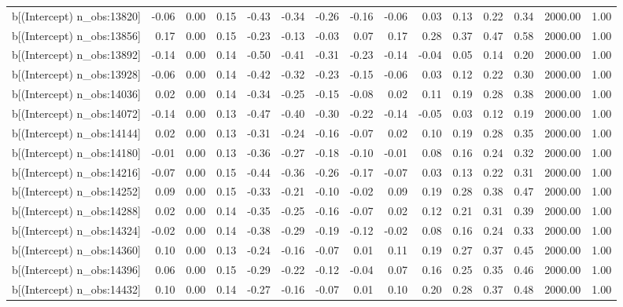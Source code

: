 \begin{table}[ht]
\begin{tabular}{rrrrrrrrrrrrrrr}
  b[(Intercept) n\_obs:13820] & -0.06 & 0.00 & 0.15 & -0.43 & -0.34 & -0.26 & -0.16 & -0.06 & 0.03 & 0.13 & 0.22 & 0.34 & 2000.00 & 1.00 \\ 
  b[(Intercept) n\_obs:13856] & 0.17 & 0.00 & 0.15 & -0.23 & -0.13 & -0.03 & 0.07 & 0.17 & 0.28 & 0.37 & 0.47 & 0.58 & 2000.00 & 1.00 \\ 
  b[(Intercept) n\_obs:13892] & -0.14 & 0.00 & 0.14 & -0.50 & -0.41 & -0.31 & -0.23 & -0.14 & -0.04 & 0.05 & 0.14 & 0.20 & 2000.00 & 1.00 \\ 
  b[(Intercept) n\_obs:13928] & -0.06 & 0.00 & 0.14 & -0.42 & -0.32 & -0.23 & -0.15 & -0.06 & 0.03 & 0.12 & 0.22 & 0.30 & 2000.00 & 1.00 \\ 
  b[(Intercept) n\_obs:14036] & 0.02 & 0.00 & 0.14 & -0.34 & -0.25 & -0.15 & -0.08 & 0.02 & 0.11 & 0.19 & 0.28 & 0.38 & 2000.00 & 1.00 \\ 
  b[(Intercept) n\_obs:14072] & -0.14 & 0.00 & 0.13 & -0.47 & -0.40 & -0.30 & -0.22 & -0.14 & -0.05 & 0.03 & 0.12 & 0.19 & 2000.00 & 1.00 \\ 
  b[(Intercept) n\_obs:14144] & 0.02 & 0.00 & 0.13 & -0.31 & -0.24 & -0.16 & -0.07 & 0.02 & 0.10 & 0.19 & 0.28 & 0.35 & 2000.00 & 1.00 \\ 
  b[(Intercept) n\_obs:14180] & -0.01 & 0.00 & 0.13 & -0.36 & -0.27 & -0.18 & -0.10 & -0.01 & 0.08 & 0.16 & 0.24 & 0.32 & 2000.00 & 1.00 \\ 
  b[(Intercept) n\_obs:14216] & -0.07 & 0.00 & 0.15 & -0.44 & -0.36 & -0.26 & -0.17 & -0.07 & 0.03 & 0.13 & 0.22 & 0.31 & 2000.00 & 1.00 \\ 
  b[(Intercept) n\_obs:14252] & 0.09 & 0.00 & 0.15 & -0.33 & -0.21 & -0.10 & -0.02 & 0.09 & 0.19 & 0.28 & 0.38 & 0.47 & 2000.00 & 1.00 \\ 
  b[(Intercept) n\_obs:14288] & 0.02 & 0.00 & 0.14 & -0.35 & -0.25 & -0.16 & -0.07 & 0.02 & 0.12 & 0.21 & 0.31 & 0.39 & 2000.00 & 1.00 \\ 
  b[(Intercept) n\_obs:14324] & -0.02 & 0.00 & 0.14 & -0.38 & -0.29 & -0.19 & -0.12 & -0.02 & 0.08 & 0.16 & 0.24 & 0.33 & 2000.00 & 1.00 \\ 
  b[(Intercept) n\_obs:14360] & 0.10 & 0.00 & 0.13 & -0.24 & -0.16 & -0.07 & 0.01 & 0.11 & 0.19 & 0.27 & 0.37 & 0.45 & 2000.00 & 1.00 \\ 
  b[(Intercept) n\_obs:14396] & 0.06 & 0.00 & 0.15 & -0.29 & -0.22 & -0.12 & -0.04 & 0.07 & 0.16 & 0.25 & 0.35 & 0.46 & 2000.00 & 1.00 \\ 
  b[(Intercept) n\_obs:14432] & 0.10 & 0.00 & 0.14 & -0.27 & -0.16 & -0.07 & 0.01 & 0.10 & 0.20 & 0.28 & 0.37 & 0.48 & 2000.00 & 1.00 \\ 

\end{tabular}
\end{table}
